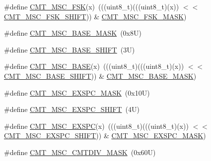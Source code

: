 \begin{DoxyCompactItemize}
\item 
\#define \mbox{\hyperlink{group___c_m_t___register___masks_gadc9ea322b17d9bf5916499ea6e210eae}{C\+M\+T\+\_\+\+M\+S\+C\+\_\+\+F\+SK}}(x)~(((uint8\+\_\+t)(((uint8\+\_\+t)(x)) $<$$<$ \mbox{\hyperlink{group___c_m_t___register___masks_ga73422722bbae07a50d0b2b473f5f9417}{C\+M\+T\+\_\+\+M\+S\+C\+\_\+\+F\+S\+K\+\_\+\+S\+H\+I\+FT}})) \& \mbox{\hyperlink{group___c_m_t___register___masks_gae434ad9168835c6d9e4d941a90a568cb}{C\+M\+T\+\_\+\+M\+S\+C\+\_\+\+F\+S\+K\+\_\+\+M\+A\+SK}})
\item 
\#define \mbox{\hyperlink{group___c_m_t___register___masks_gac099af54e9456cad9c3343184d3e041a}{C\+M\+T\+\_\+\+M\+S\+C\+\_\+\+B\+A\+S\+E\+\_\+\+M\+A\+SK}}~(0x8\+U)
\item 
\#define \mbox{\hyperlink{group___c_m_t___register___masks_ga3ddb10ae744a6e2149a0d0185a796571}{C\+M\+T\+\_\+\+M\+S\+C\+\_\+\+B\+A\+S\+E\+\_\+\+S\+H\+I\+FT}}~(3\+U)
\item 
\#define \mbox{\hyperlink{group___c_m_t___register___masks_gacec32d932436280ba984ee706b1459d7}{C\+M\+T\+\_\+\+M\+S\+C\+\_\+\+B\+A\+SE}}(x)~(((uint8\+\_\+t)(((uint8\+\_\+t)(x)) $<$$<$ \mbox{\hyperlink{group___c_m_t___register___masks_ga3ddb10ae744a6e2149a0d0185a796571}{C\+M\+T\+\_\+\+M\+S\+C\+\_\+\+B\+A\+S\+E\+\_\+\+S\+H\+I\+FT}})) \& \mbox{\hyperlink{group___c_m_t___register___masks_gac099af54e9456cad9c3343184d3e041a}{C\+M\+T\+\_\+\+M\+S\+C\+\_\+\+B\+A\+S\+E\+\_\+\+M\+A\+SK}})
\item 
\#define \mbox{\hyperlink{group___c_m_t___register___masks_gafeb71169b6c47237583101487f6412e1}{C\+M\+T\+\_\+\+M\+S\+C\+\_\+\+E\+X\+S\+P\+C\+\_\+\+M\+A\+SK}}~(0x10\+U)
\item 
\#define \mbox{\hyperlink{group___c_m_t___register___masks_ga7a71704451408ca7e8c8802fa72d4e4d}{C\+M\+T\+\_\+\+M\+S\+C\+\_\+\+E\+X\+S\+P\+C\+\_\+\+S\+H\+I\+FT}}~(4\+U)
\item 
\#define \mbox{\hyperlink{group___c_m_t___register___masks_ga26a2204d2f6ef672902baa2d571f7e89}{C\+M\+T\+\_\+\+M\+S\+C\+\_\+\+E\+X\+S\+PC}}(x)~(((uint8\+\_\+t)(((uint8\+\_\+t)(x)) $<$$<$ \mbox{\hyperlink{group___c_m_t___register___masks_ga7a71704451408ca7e8c8802fa72d4e4d}{C\+M\+T\+\_\+\+M\+S\+C\+\_\+\+E\+X\+S\+P\+C\+\_\+\+S\+H\+I\+FT}})) \& \mbox{\hyperlink{group___c_m_t___register___masks_gafeb71169b6c47237583101487f6412e1}{C\+M\+T\+\_\+\+M\+S\+C\+\_\+\+E\+X\+S\+P\+C\+\_\+\+M\+A\+SK}})
\item 
\#define \mbox{\hyperlink{group___c_m_t___register___masks_gab663f14909462192c6e432c7bd0e56bf}{C\+M\+T\+\_\+\+M\+S\+C\+\_\+\+C\+M\+T\+D\+I\+V\+\_\+\+M\+A\+SK}}~(0x60\+U)
$$
\end{DoxyCompactItemize}
